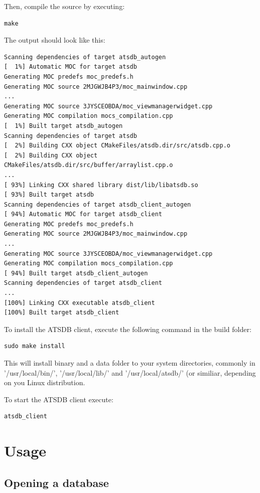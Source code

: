 \documentclass[10pt,letterpaper,extrafontsizes]{memoir}
\begin{document}
Then, compile the source by executing:

\begin{verbatim}
make
\end{verbatim}

The output should look like this:

\begin{verbatim}
Scanning dependencies of target atsdb_autogen
[  1%] Automatic MOC for target atsdb
Generating MOC predefs moc_predefs.h
Generating MOC source 2MJGWJB4P3/moc_mainwindow.cpp
...
Generating MOC source 3JYSCEOBDA/moc_viewmanagerwidget.cpp
Generating MOC compilation mocs_compilation.cpp
[  1%] Built target atsdb_autogen
Scanning dependencies of target atsdb
[  2%] Building CXX object CMakeFiles/atsdb.dir/src/atsdb.cpp.o
[  2%] Building CXX object CMakeFiles/atsdb.dir/src/buffer/arraylist.cpp.o
...
[ 93%] Linking CXX shared library dist/lib/libatsdb.so
[ 93%] Built target atsdb
Scanning dependencies of target atsdb_client_autogen
[ 94%] Automatic MOC for target atsdb_client
Generating MOC predefs moc_predefs.h
Generating MOC source 2MJGWJB4P3/moc_mainwindow.cpp
...
Generating MOC source 3JYSCEOBDA/moc_viewmanagerwidget.cpp
Generating MOC compilation mocs_compilation.cpp
[ 94%] Built target atsdb_client_autogen
Scanning dependencies of target atsdb_client
...
[100%] Linking CXX executable atsdb_client
[100%] Built target atsdb_client
\end{verbatim}

To install the ATSDB client, execute the following command in the build folder:

\begin{verbatim}
sudo make install
\end{verbatim}

This will install binary and a data folder to your system directories, commonly in '/usr/local/bin/', '/usr/local/lib/' and '/usr/local/atsdb/' (or similiar, depending on you Linux distribution.

To start the ATSDB client execute:

\begin{verbatim}
atsdb_client
\end{verbatim}

\chapter{Usage}
\label{sec:usage}

\section{Opening a database}
\label{sec:startup}
\end{document}

